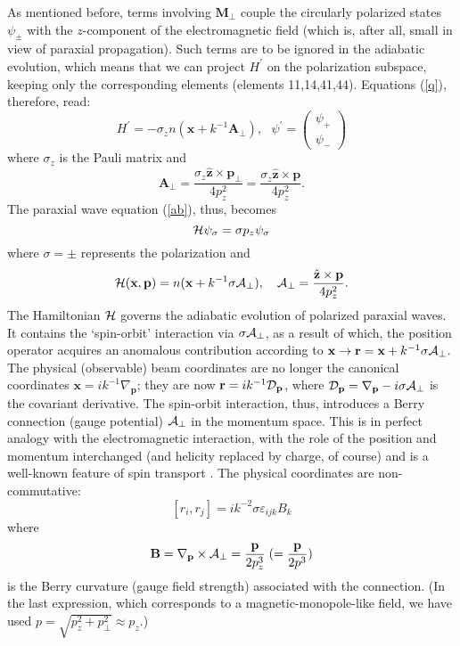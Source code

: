 \documentclass[aps,pra,preprint,superscriptaddress,showpacs,showkeys]{revtex4}
\begin{document}
As mentioned before, terms involving $\textbf{M}_\bot$ couple the circularly polarized states $\psi_\pm$ with the $z$-component of the electromagnetic field (which is, after all, small in view of paraxial propagation). Such terms are to be ignored in the adiabatic evolution, which means that we can project $H^\prime$ on the polarization subspace, keeping only the corresponding elements (elements 11,14,41,44). Equations (\ref{q}), therefore, read:
$$
H^\prime=-\sigma_z n(\textbf{x}+k^{-1}\textbf{A}_\bot),  \ \ \ \psi^\prime=\left( \begin{array}{c}\psi_+\\ \psi_- \end{array} \right) 
$$
where $\sigma_z$ is the Pauli matrix and
$$
\textbf{A}_\bot=\frac{\sigma_z\hat{\textbf{z}}\times\textbf{p}_\bot}{4p_z^2}=\frac{\sigma_z\hat{\textbf{z}}\times\textbf{p}}{4p_z^2}.
$$
 The paraxial wave equation (\ref{ab}), thus, becomes
$$
{\cal H} \psi_\sigma=\sigma p_z \psi_\sigma
$$
where $\sigma=\pm $ represents the polarization and 
\begin{equation}
{\cal H}(\textbf{x},\textbf{p})=n(\textbf{x}+k^{-1} \sigma{\bf {\cal A}}_\bot), \ \ \ {\bf {\cal A}}_\bot=\frac{\hat{\textbf{z}}\times\textbf{p}}{4p_z^2}. \label{eq}
\end{equation}
The Hamiltonian ${\cal H}$ governs the adiabatic evolution of polarized paraxial waves. It contains the `spin-orbit' interaction via $\sigma{\bf {\cal A}}_\bot$, as a result of which, the position operator acquires an anomalous contribution according to $\textbf{x}\rightarrow\textbf{r}=\textbf{x}+k^{-1} \sigma{\bf {\cal A}}_\bot$. The physical (observable) beam coordinates are no longer the canonical coordinates $\textbf{x}=ik^{-1}\nabla_\textbf{p}$; they are now $\textbf{r}=ik^{-1}{\cal D}_\textbf{p}$, where ${\cal D}_\textbf{p}=\nabla_\textbf{p}-i\sigma{\bf {\cal A}}_\bot$ is the covariant derivative. The spin-orbit interaction, thus, introduces a Berry connection (gauge potential) ${\bf {\cal A}}_\bot$ in the momentum space. This is in perfect analogy with the electromagnetic interaction, with the role of the position and momentum interchanged (and helicity replaced by charge, of course) and is a well-known feature of spin transport \cite{Bliokh,Bliokh1,Bliokh2,Berard,Mehrafarin}. The physical coordinates are non-commutative: 
$$
[r_i,r_j]=ik^{-2}\sigma \varepsilon_{ijk}B_k
$$
where 
$$
\textbf{B}=\nabla_\textbf{p}\times{\bf {\cal A}}_\bot=\frac{\textbf{p}}{2p_z^3}\;(=\frac{\textbf{p}}{2p^3})
$$
is the Berry curvature (gauge field strength) associated with the connection. (In the last expression, which corresponds to a magnetic-monopole-like field, we have used $p=\sqrt{p_z^2+p_\bot^2}\approx p_z$.)
\end{document}

